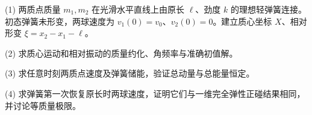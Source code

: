 (1) 两质点质量 \(m_1,m_2\) 在光滑水平直线上由原长 \(\ell\)、劲度 \(k\) 的理想轻弹簧连接。初态弹簧未形变，两球速度为 \(v_1(0)=v_0\)、\(v_2(0)=0\)。建立质心坐标 \(X\)、相对形变 \(\xi=x_2-x_1-\ell\)。

(2) 求质心运动和相对振动的质量约化、角频率与准确初值解。

(3) 求任意时刻两质点速度及弹簧储能，验证总动量与总能量恒定。

(4) 求弹簧第一次恢复原长时两球速度，证明它们与一维完全弹性正碰结果相同，并讨论等质量极限。
